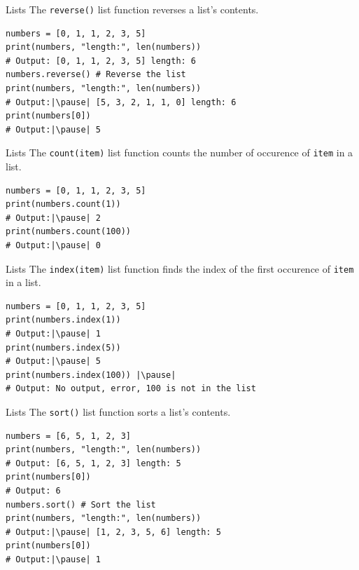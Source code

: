 \documentclass[dvipsnames, svgnames, x11names, handout]{beamer}
\begin{document}
\begin{frame}[fragile]{Lists}
The \texttt{reverse()} list function reverses a list's contents. \pause

\begin{verbatim}
numbers = [0, 1, 1, 2, 3, 5]
print(numbers, "length:", len(numbers)) 
# Output: [0, 1, 1, 2, 3, 5] length: 6
numbers.reverse() # Reverse the list
print(numbers, "length:", len(numbers)) 
# Output:|\pause| [5, 3, 2, 1, 1, 0] length: 6
print(numbers[0])
# Output:|\pause| 5
\end{verbatim}
\end{frame}

\begin{frame}[fragile]{Lists}
The \texttt{count(item)} list function counts the number of occurence of \texttt{item} in a list. \pause

\begin{verbatim}
numbers = [0, 1, 1, 2, 3, 5]
print(numbers.count(1)) 
# Output:|\pause| 2
print(numbers.count(100)) 
# Output:|\pause| 0
\end{verbatim}
\end{frame}

\begin{frame}[fragile]{Lists}
The \texttt{index(item)} list function finds the index of the first occurence of \texttt{item} in a list. \pause

\begin{verbatim}
numbers = [0, 1, 1, 2, 3, 5]
print(numbers.index(1)) 
# Output:|\pause| 1
print(numbers.index(5)) 
# Output:|\pause| 5
print(numbers.index(100)) |\pause|
# Output: No output, error, 100 is not in the list
\end{verbatim}
\end{frame}

\begin{frame}[fragile]{Lists}
The \texttt{sort()} list function sorts a list's contents. \pause

\begin{verbatim}
numbers = [6, 5, 1, 2, 3]
print(numbers, "length:", len(numbers)) 
# Output: [6, 5, 1, 2, 3] length: 5
print(numbers[0])
# Output: 6
numbers.sort() # Sort the list
print(numbers, "length:", len(numbers)) 
# Output:|\pause| [1, 2, 3, 5, 6] length: 5
print(numbers[0])
# Output:|\pause| 1
\end{verbatim}
\end{frame}
\end{document}
